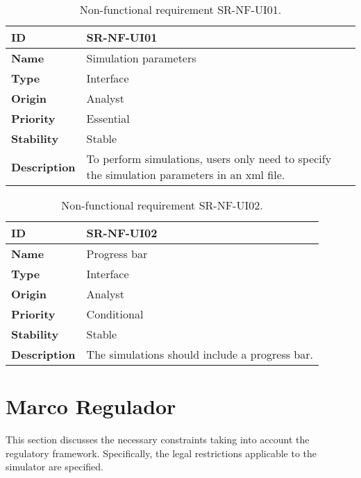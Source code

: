 \begin{center}
\begin{table*}[htbp]
\centering
\begin{tabular}{@{}p{2.5cm} p{9cm}@{}} 
\toprule
\textbf{ID} 				& SR-NF-UI01\\
\midrule
\textbf{Name} 			& Simulation parameters \\
\midrule
\textbf{Type} 			& Interface \\
\midrule
\textbf{Origin} 			& Analyst \\
\midrule
\textbf{Priority}		& Essential \\
\midrule
\textbf{Stability} 		& Stable \\
\midrule
\textbf{Description} 	& To perform simulations, users only need to specify the simulation parameters in an \gls{xml} file. \\
\bottomrule
\end{tabular}
\caption{Non-functional requirement SR-NF-UI01.}
\label{tab:srnfui01}
\end{table*}
\end{center}

\begin{center}
\begin{table*}[htbp]
\centering
\begin{tabular}{@{}p{2.5cm} p{9cm}@{}}  
\toprule
\textbf{ID} 				& SR-NF-UI02\\
\midrule
\textbf{Name} 			& Progress bar \\
\midrule
\textbf{Type} 			& Interface \\
\midrule
\textbf{Origin} 			& Analyst \\
\midrule
\textbf{Priority}		& Conditional \\
\midrule
\textbf{Stability} 		& Stable \\
\midrule
\textbf{Description} 	& The simulations should include a progress bar. \\
\bottomrule
\end{tabular}
\caption{Non-functional requirement SR-NF-UI02.}
\label{tab:srnfui02}
\end{table*}
\end{center}

\section{Marco Regulador}
\label{sec:regulatory_framework}

This section discusses the necessary constraints taking into account the regulatory \gls{framework}. Specifically, the legal restrictions applicable to the simulator are specified.


